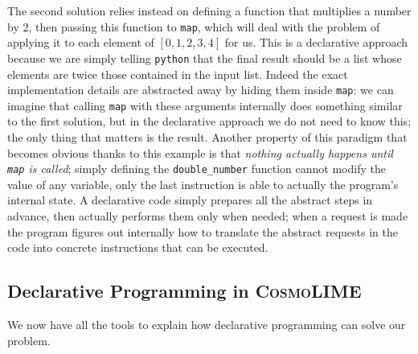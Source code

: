 The second solution relies instead on defining a function that multiplies a number by 2, then passing this function to \texttt{map}, which will deal with the problem of applying it to each element of $[0, 1, 2, 3, 4]$ for us. This is a declarative approach because we are simply telling \texttt{python} that the final result should be a list whose elements are twice those contained in the input list. Indeed the exact implementation details are abstracted away by hiding them inside \texttt{map}: we can imagine that calling \texttt{map} with these arguments internally does something similar to the first solution, but in the declarative approach we do not need to know this; the only thing that matters is the result. Another property of this paradigm that becomes obvious thanks to this example is that \emph{nothing actually happens until \texttt{map} is called}; simply defining the \texttt{double\_number} function cannot modify the value of any variable, only the last instruction is able to actually the program's internal state. A declarative code simply prepares all the abstract steps in advance, then actually performs them only when needed; when a request is made the program figures out internally how to translate the abstract requests in the code into concrete instructions that can be executed.

\subsection{Declarative Programming in \textsc{CosmoLIME}}
We now have all the tools to explain how declarative programming can solve our problem.

